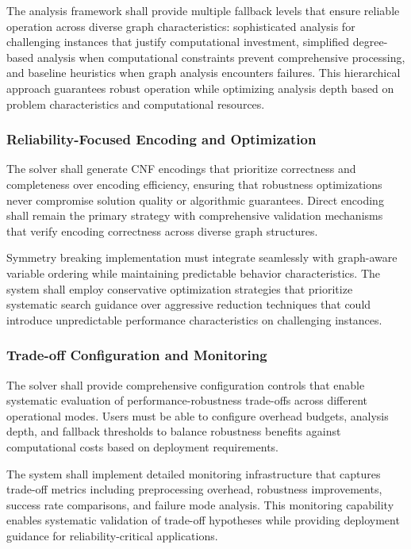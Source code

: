 The analysis framework shall provide multiple fallback levels that ensure reliable operation across diverse graph characteristics: sophisticated analysis for challenging instances that justify computational investment, simplified degree-based analysis when computational constraints prevent comprehensive processing, and baseline heuristics when graph analysis encounters failures. This hierarchical approach guarantees robust operation while optimizing analysis depth based on problem characteristics and computational resources.

\subsubsection{Reliability-Focused Encoding and Optimization}
The solver shall generate CNF encodings that prioritize correctness and completeness over encoding efficiency, ensuring that robustness optimizations never compromise solution quality or algorithmic guarantees. Direct encoding shall remain the primary strategy with comprehensive validation mechanisms that verify encoding correctness across diverse graph structures.

Symmetry breaking implementation must integrate seamlessly with graph-aware variable ordering while maintaining predictable behavior characteristics. The system shall employ conservative optimization strategies that prioritize systematic search guidance over aggressive reduction techniques that could introduce unpredictable performance characteristics on challenging instances.

\subsubsection{Trade-off Configuration and Monitoring}
The solver shall provide comprehensive configuration controls that enable systematic evaluation of performance-robustness trade-offs across different operational modes. Users must be able to configure overhead budgets, analysis depth, and fallback thresholds to balance robustness benefits against computational costs based on deployment requirements.

The system shall implement detailed monitoring infrastructure that captures trade-off metrics including preprocessing overhead, robustness improvements, success rate comparisons, and failure mode analysis. This monitoring capability enables systematic validation of trade-off hypotheses while providing deployment guidance for reliability-critical applications.

